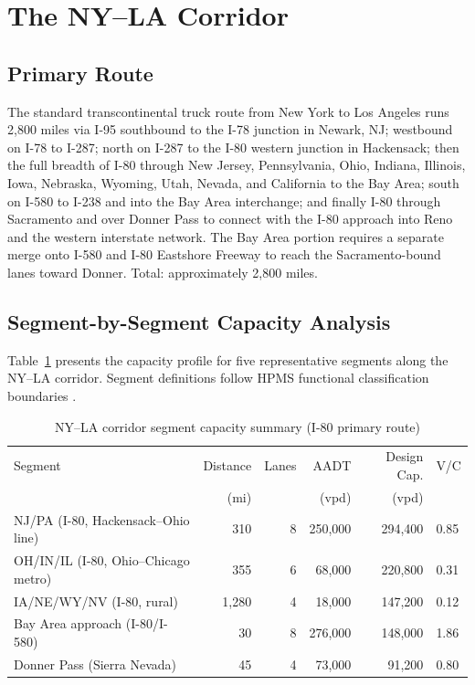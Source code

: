 \section{The NY--LA Corridor}
\label{sec:nyla}

\subsection{Primary Route}

The standard transcontinental truck route from New York to Los Angeles runs 2,800 miles via I-95 southbound to the I-78 junction in Newark, NJ; westbound on I-78 to I-287; north on I-287 to the I-80 western junction in Hackensack; then the full breadth of I-80 through New Jersey, Pennsylvania, Ohio, Indiana, Illinois, Iowa, Nebraska, Wyoming, Utah, Nevada, and California to the Bay Area; south on I-580 to I-238 and into the Bay Area interchange; and finally I-80 through Sacramento and over Donner Pass to connect with the I-80 approach into Reno and the western interstate network. The Bay Area portion requires a separate merge onto I-580 and I-80 Eastshore Freeway to reach the Sacramento-bound lanes toward Donner. Total: approximately 2,800 miles.

\subsection{Segment-by-Segment Capacity Analysis}

Table~\ref{tab:nyla_segments} presents the capacity profile for five representative segments along the NY--LA corridor. Segment definitions follow HPMS functional classification boundaries \citep{HPMS2018}.

\begin{table}[ht]
\centering
\caption{NY--LA corridor segment capacity summary (I-80 primary route)}
\label{tab:nyla_segments}
\begin{tabular}{lrrrrl}
\toprule
Segment & Distance & Lanes & AADT & Design Cap. & V/C \\
        & (mi)     &       & (vpd) & (vpd) & \\
\midrule
NJ/PA (I-80, Hackensack--Ohio line)    & 310 & 8 & 250,000 & 294,400 & 0.85 \\
OH/IN/IL (I-80, Ohio--Chicago metro)  & 355 & 6 & 68,000  & 220,800 & 0.31 \\
IA/NE/WY/NV (I-80, rural)            & 1,280 & 4 & 18,000 & 147,200 & 0.12 \\
Bay Area approach (I-80/I-580)        & 30  & 8 & 276,000 & 148,000 & 1.86 \\
Donner Pass (Sierra Nevada)           & 45  & 4 & 73,000  & 91,200  & 0.80 \\
\bottomrule
\end{tabular}
\end{table}

